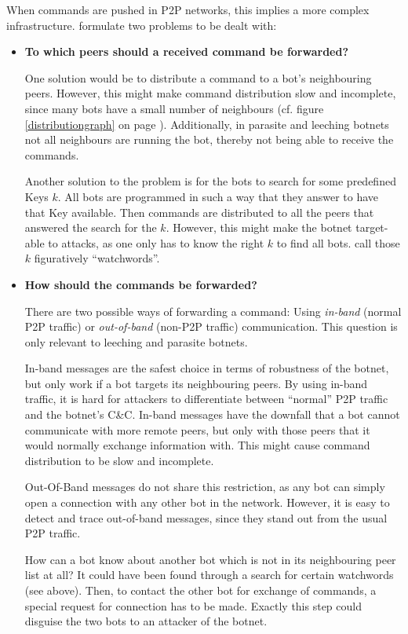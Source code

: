 \documentclass{llncs}
\begin{document}
When commands are pushed in P2P networks, this implies a more complex
infrastructure. \cite{wang2009systematic} formulate two problems to be dealt
with:

\begin{itemize}
\item {\bf To which peers should a received command be forwarded?}


One solution would be to distribute a command to a bot's neighbouring
peers. However, this might make command distribution slow and
incomplete, since many bots have a small number of neighbours
(cf. figure \ref{distributiongraph} on page
\pageref{distributiongraph}). Additionally, in parasite and leeching
botnets not all neighbours are running the bot, thereby not being
able to receive the commands.


Another solution to the problem is for the bots to search for some
predefined Keys $k$. All bots are programmed in such a way that they
answer to have that Key available. Then commands are distributed to
all the peers that answered the search for the $k$. However, this
might make the botnet target-able to attacks, as one only has to know
the right $k$ to find all bots. \cite{wang2009systematic} call those
$k$ figuratively ``watchwords''.

\item {\bf How should the commands be forwarded?}

There are two possible ways of forwarding a command: Using {\it
  in-band} (normal P2P traffic) or {\it out-of-band} (non-P2P traffic)
communication. This question is only relevant to leeching and
parasite botnets.

In-band messages are the safest choice in terms of robustness of the
botnet, but only work if a bot targets its neighbouring
peers\cite{wang2009systematic}. By using in-band traffic, it is hard
for attackers to differentiate between ``normal'' P2P traffic and the
botnet's C\&C. In-band messages have the downfall that a bot cannot
communicate with more remote peers, but only with those peers that it
would normally exchange information with. This might cause command
distribution to be slow and incomplete.

Out-Of-Band messages do not share this restriction, as any bot can
simply open a connection with any other bot in the network. However,
it is easy to detect and trace out-of-band messages, since they stand
out from the usual P2P traffic. 

How can a bot know about another bot which is not in its neighbouring
peer list at all? It could have been found through a search for
certain watchwords (see above). Then, to contact the other bot for
exchange of commands, a special request for connection has to be
made. Exactly this step could disguise the two bots to an attacker of
the botnet.
\end{itemize}
\end{document}

